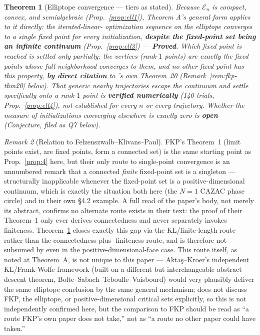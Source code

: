 \documentclass[11pt]{article}
\theoremstyle{plain}
\newtheorem{theorem}{Theorem}[section]
\theoremstyle{definition}
\theoremstyle{remark}
\newtheorem{remark}[theorem]{Remark}
\newcommand{\El}{\mathcal E_n}
\begin{document}
\begin{theorem}[Elliptope convergence --- tiers as stated]\label{thm:ell}
Because $\El$ is compact, convex, and semialgebraic (Prop.~\ref{prop:ell1}),
Theorem A's general form applies to it directly: the iterated-linear-
optimization sequence on the elliptope converges to a single fixed point
for every initialization, \textbf{despite the fixed-point set being an
infinite continuum} (Prop.~\ref{prop:ell3}) --- \textbf{Proved}. Which
fixed point is reached is settled only partially: the vertices (rank-$1$
points) are exactly the fixed points whose full neighborhood converges to
them, and no other fixed point has this property, \textbf{by direct
citation} to \cite{FKP21}'s own Theorem~20 (Remark~\ref{rem:fkp-thm20}
below). That generic nearby trajectories escape the continuum and settle
specifically onto a rank-$1$ point is \textbf{verified numerically} (140
trials, Prop.~\ref{prop:ell4}), not established for every $n$ or every
trajectory. Whether the measure of initializations converging elsewhere
is exactly zero is \textbf{open} (Conjecture, filed as Q7 below).
\end{theorem}

\begin{remark}[Relation to Felzenszwalb--Klivans--Paul]
FKP's Theorem~1 (limit points exist, are fixed points, form a connected
set) is the same starting point as Prop.~\ref{prop:4} here, but their only
route to single-point convergence is an unnumbered remark that a connected
\emph{finite} fixed-point set is a singleton --- structurally inapplicable
whenever the fixed-point set is a positive-dimensional continuum, which is
exactly the situation both here (the $N=1$ CAZAC phase circle) and in their
own \S4.2 example. A full read of the paper's body, not merely its
abstract, confirms no alternate route exists in their text: the proof of
their Theorem~1 only ever derives connectedness and never separately
invokes finiteness. Theorem~\ref{thm:ell} closes exactly this gap via the
KL/finite-length route \cite{ABS13} rather than the connectedness-plus-
finiteness route, and is therefore not subsumed by \cite{FKP21} even in the
positive-dimensional-face case. This route itself, as noted at Theorem~A,
is not unique to this paper --- Aktaş--Kroer's \cite{AK25} independent
KL/Frank-Wolfe framework (built on a different but interchangeable
abstract descent theorem, Bolte--Sabach--Teboulle--Vaisbourd) would very
plausibly deliver the same elliptope conclusion by the same general
mechanism; \cite{AK25} does not discuss FKP, the elliptope, or
positive-dimensional critical sets explicitly, so this is not independently
confirmed here, but the comparison to FKP should be read as ``a route
FKP's own paper does not take,'' not as ``a route no other paper could
have taken.''
\end{remark}
\end{document}
